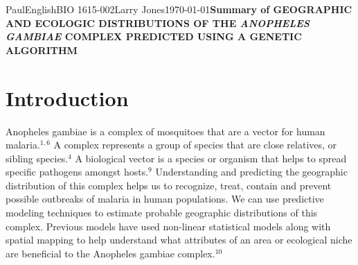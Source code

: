 \documentclass[10pt,twocolumn]{article}
\begin{document}
\begin{mla}{Paul}{English}{BIO 1615-002}{Larry Jones}{\today}{\textbf{Summary of GEOGRAPHIC AND ECOLOGIC DISTRIBUTIONS OF THE \textit{ANOPHELES GAMBIAE} COMPLEX PREDICTED USING A GENETIC ALGORITHM}}


\section{Introduction}


Anopheles gambiae is a complex of mosquitoes that are a vector for human malaria.$^{1,6}$ A complex represents a group of species that are close relatives, or sibling species.$^4$ A biological vector is a species or organism that helps to spread specific pathogens amongst hosts.$^9$ Understanding and predicting the geographic distribution of this complex helps us to recognize, treat, contain and prevent possible outbreaks of malaria in human populations. We can use predictive modeling techniques to estimate probable geographic distributions of this complex. Previous models have used non-linear statistical models along with spatial mapping to help understand what attributes of an area or ecological niche are beneficial to the Anopheles gambiae complex.$^{10}$


\end{mla}
\end{document}

